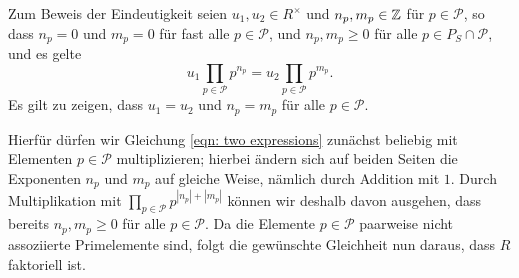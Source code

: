 \documentclass[a4paper,10pt,numbers=noenddot]{scrartcl}
\begin{document}
Zum Beweis der Eindeutigkeit seien $u_1, u_2 \in R^\times$ und $n_p, m_p \in \mathbb{Z}$ für $p \in \mathcal{P}$, so dass $n_p = 0$ und $m_p = 0$ für fast alle $p \in \mathcal{P}$, und $n_p, m_p \geq 0$ für alle $p \in P_S \cap \mathcal{P}$, und es gelte
\begin{equation}
  \label{eqn: two expressions}
    u_1 \prod_{p \in \mathcal{P}} p^{n_p}
  = u_2 \prod_{p \in \mathcal{P}} p^{m_p}.
\end{equation}
Es gilt zu zeigen, dass $u_1 = u_2$ und $n_p = m_p$ für alle $p \in \mathcal{P}$.

Hierfür dürfen wir Gleichung \eqref{eqn: two expressions} zunächst beliebig mit Elementen $p \in \mathcal{P}$ multiplizieren; hierbei ändern sich auf beiden Seiten die Exponenten $n_p$ und $m_p$ auf gleiche Weise, nämlich durch Addition mit $1$.
Durch Multiplikation mit $\prod_{p \in \mathcal{P}} p^{|n_p| + |m_p|}$ können wir deshalb davon ausgehen, dass bereits $n_p, m_p \geq 0$ für alle $p \in \mathcal{P}$.
Da die Elemente $p \in \mathcal{P}$ paarweise nicht assoziierte Primelemente sind, folgt die gewünschte Gleichheit nun daraus, dass $R$ faktoriell ist.
\end{document}
